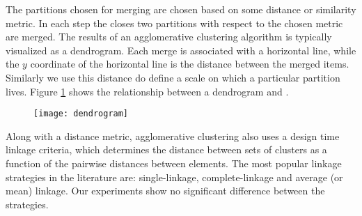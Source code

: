 The partitions chosen for merging are chosen based on some distance or similarity metric. In each step
the closes two partitions with respect to the chosen metric are merged. The results of an agglomerative clustering
algorithm is typically visualized as a dendrogram. Each merge is associated with a horizontal line, while
the $y$ coordinate of the horizontal line is the distance between the merged items. Similarly
we use this distance do define a scale on which a particular partition lives. Figure \ref{fig:dendrogram} shows
the relationship between a dendrogram and .

\begin{figure}[h!]
	\centering
	\texttt{[image: dendrogram]}
	\caption{}
	\label{fig:dendrogram}
\end{figure}

Along with a distance metric, agglomerative clustering also uses a design time linkage criteria, which determines
the distance between sets of clusters as a function of the pairwise distances between elements. The most popular
linkage strategies in the literature are: single-linkage, complete-linkage and average (or mean) linkage. Our
experiments show no significant difference between the strategies.
